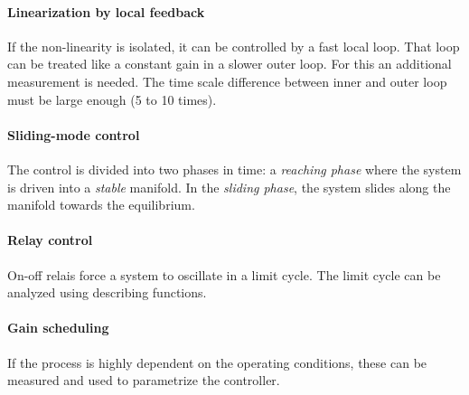 \paragraph{Linearization by local feedback}
If the non-linearity is isolated, it can be controlled by a fast local loop. 
That loop can be treated like a constant gain in a slower outer loop.
For this an additional measurement is needed.
The time scale difference between inner and outer loop must be large enough (5 to 10 times).

\paragraph{Sliding-mode control}
The control is divided into two phases in time: a \emph{reaching phase} where the system
is driven into a \emph{stable} manifold.
In the \emph{sliding phase}, the system slides along the manifold towards the equilibrium.

\paragraph{Relay control}
On-off relais force a system to oscillate in a limit cycle.
The limit cycle can be analyzed using describing functions.

\paragraph{Gain scheduling}
If the process is highly dependent on the operating conditions, these can be measured and
used to parametrize the controller.